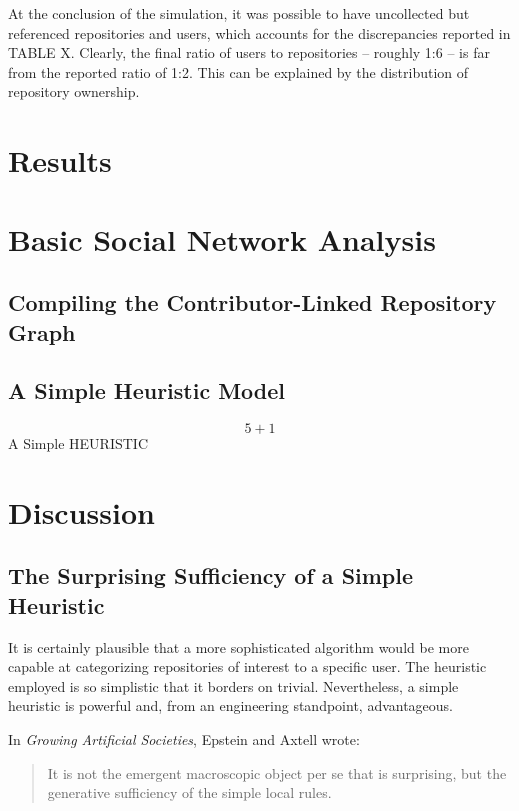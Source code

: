\documentclass{article}
\begin{document}
  At the conclusion of the simulation, it was possible to have uncollected but referenced repositories and users, which accounts for the discrepancies reported in TABLE X. Clearly, the final ratio of users to repositories -- roughly 1:6 -- is far from the reported ratio of 1:2. This can be explained by the distribution of repository ownership.

  \section{Results}

  \section{Basic Social Network Analysis}
  
  \subsection{Compiling the Contributor-Linked Repository Graph}

  \subsection{A Simple Heuristic Model}

  \begin{equation}
    5 + 1
  \end{equation}
  A Simple HEURISTIC

  \section{Discussion}

  \subsection{The Surprising Sufficiency of a Simple Heuristic}
  It is certainly plausible that a more sophisticated algorithm would be more capable at categorizing repositories of interest to a specific user. The heuristic employed is so simplistic that it borders on trivial. Nevertheless, a simple heuristic is powerful and, from an engineering standpoint, advantageous.

  In \emph{Growing Artificial Societies}, Epstein and Axtell wrote:

  \begin{quote}
    It is not the emergent macroscopic object per se that is surprising, but the generative sufficiency of the simple local rules.\cite[p.52]{gas}
  \end{quote}
\end{document}
